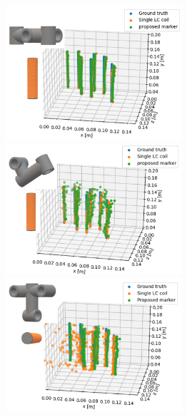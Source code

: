 \documentclass[journal,twoside,web]{ieeecolor}
\begin{document}
\begin{figure}[t]
  \begin{minipage}{0.5\hsize}
  \begin{center}
   \centerline{\includegraphics[width=65mm]{figure/yaxis_x-axis_0deg_4LC_2.png}}
  \end{center}
 \end{minipage}
  \begin{minipage}{0.5\hsize}
  \begin{center}
   \centerline{\includegraphics[width=65mm]{figure/yaxis-x0_2.png}}
  \end{center}
 \end{minipage}
 \begin{minipage}{0.5\hsize}
  \begin{center}
   \centerline{\includegraphics[width=65mm]{figure/yaxis_z-axis_90deg_4LC_2.png}}
  \end{center}
 \end{minipage}
 \begin{minipage}{0.5\hsize}
  \begin{center}

\end{center}
\end{minipage}
\end{figure}
\end{document}
